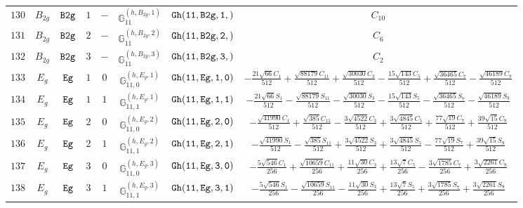 \documentclass[fleqn,8pt]{jsarticle}
\begin{document}
\begin{table}[ht!]
\begin{center}
\begin{tabular}{cccccccc}
$ 130 $ & $ B_{2g} $ & $ {\tt B2g} $ & $ 1 $ & $ - $ & $ \mathbb{G}_{11}^{(h,B_{2g},1)} $ & $ {\tt Gh(11,B2g,1,)} $ & $ C_{10} $ \\
$ 131 $ & $ B_{2g} $ & $ {\tt B2g} $ & $ 2 $ & $ - $ & $ \mathbb{G}_{11}^{(h,B_{2g},2)} $ & $ {\tt Gh(11,B2g,2,)} $ & $ C_{6} $ \\
$ 132 $ & $ B_{2g} $ & $ {\tt B2g} $ & $ 3 $ & $ - $ & $ \mathbb{G}_{11}^{(h,B_{2g},3)} $ & $ {\tt Gh(11,B2g,3,)} $ & $ C_{2} $ \\
$ 133 $ & $ E_{g} $ & $ {\tt Eg} $ & $ 1 $ & $ 0 $ & $ \mathbb{G}_{11,0}^{(h,E_{g},1)} $ & $ {\tt Gh(11,Eg,1,0)} $ & $ - \frac{21 \sqrt{66} C_{1}}{512} + \frac{\sqrt{88179} C_{11}}{512} + \frac{\sqrt{30030} C_{3}}{512} - \frac{15 \sqrt{143} C_{5}}{512} + \frac{\sqrt{36465} C_{7}}{512} - \frac{\sqrt{46189} C_{9}}{512} $ \\
$ 134 $ & $ E_{g} $ & $ {\tt Eg} $ & $ 1 $ & $ 1 $ & $ \mathbb{G}_{11,1}^{(h,E_{g},1)} $ & $ {\tt Gh(11,Eg,1,1)} $ & $ - \frac{21 \sqrt{66} S_{1}}{512} - \frac{\sqrt{88179} S_{11}}{512} - \frac{\sqrt{30030} S_{3}}{512} - \frac{15 \sqrt{143} S_{5}}{512} - \frac{\sqrt{36465} S_{7}}{512} - \frac{\sqrt{46189} S_{9}}{512} $ \\
$ 135 $ & $ E_{g} $ & $ {\tt Eg} $ & $ 2 $ & $ 0 $ & $ \mathbb{G}_{11,0}^{(h,E_{g},2)} $ & $ {\tt Gh(11,Eg,2,0)} $ & $ - \frac{\sqrt{41990} C_{1}}{512} + \frac{\sqrt{385} C_{11}}{512} - \frac{3 \sqrt{4522} C_{3}}{512} + \frac{3 \sqrt{4845} C_{5}}{512} + \frac{77 \sqrt{19} C_{7}}{512} + \frac{39 \sqrt{15} C_{9}}{512} $ \\
$ 136 $ & $ E_{g} $ & $ {\tt Eg} $ & $ 2 $ & $ 1 $ & $ \mathbb{G}_{11,1}^{(h,E_{g},2)} $ & $ {\tt Gh(11,Eg,2,1)} $ & $ - \frac{\sqrt{41990} S_{1}}{512} - \frac{\sqrt{385} S_{11}}{512} + \frac{3 \sqrt{4522} S_{3}}{512} + \frac{3 \sqrt{4845} S_{5}}{512} - \frac{77 \sqrt{19} S_{7}}{512} + \frac{39 \sqrt{15} S_{9}}{512} $ \\
$ 137 $ & $ E_{g} $ & $ {\tt Eg} $ & $ 3 $ & $ 0 $ & $ \mathbb{G}_{11,0}^{(h,E_{g},3)} $ & $ {\tt Gh(11,Eg,3,0)} $ & $ - \frac{5 \sqrt{546} C_{1}}{256} + \frac{\sqrt{10659} C_{11}}{256} + \frac{11 \sqrt{30} C_{3}}{256} + \frac{13 \sqrt{7} C_{5}}{256} - \frac{3 \sqrt{1785} C_{7}}{256} + \frac{3 \sqrt{2261} C_{9}}{256} $ \\
$ 138 $ & $ E_{g} $ & $ {\tt Eg} $ & $ 3 $ & $ 1 $ & $ \mathbb{G}_{11,1}^{(h,E_{g},3)} $ & $ {\tt Gh(11,Eg,3,1)} $ & $ - \frac{5 \sqrt{546} S_{1}}{256} - \frac{\sqrt{10659} S_{11}}{256} - \frac{11 \sqrt{30} S_{3}}{256} + \frac{13 \sqrt{7} S_{5}}{256} + \frac{3 \sqrt{1785} S_{7}}{256} + \frac{3 \sqrt{2261} S_{9}}{256} $ \\

\end{tabular}
\end{center}
\end{table}
\end{document}
